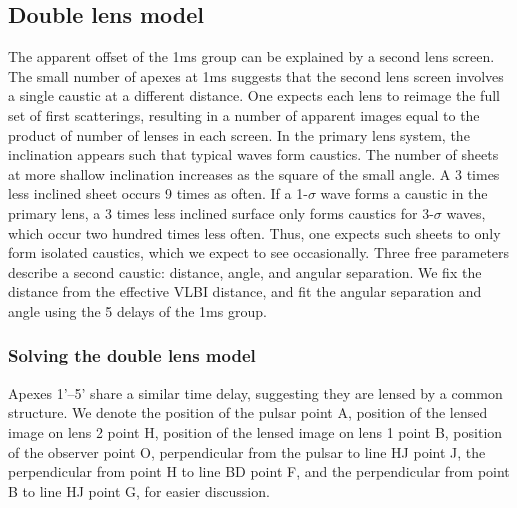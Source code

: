 \documentclass[useAMS,usenatbib]{mn2e}
\begin{document}
\subsection{Double lens model}
\label{doublelensmodel}

The apparent offset of the 1ms group can be explained by a second lens
screen.  The small number of apexes at 1ms suggests that the second
lens screen involves a single caustic at a different distance.  One
expects each lens to reimage the full set of first scatterings,
resulting in a number of apparent images equal to the product of
number of lenses in each screen.
In the
primary lens system, the inclination appears such that typical waves
form caustics.  The number of sheets at more shallow inclination
increases as the square of the small angle.  A 3 times less inclined
sheet occurs 9 times as often.  If a 1-$\sigma$ wave forms a caustic
in the primary lens, a 3 times less inclined surface only forms
caustics for 3-$\sigma$ waves, which occur two hundred times less
often.  Thus, one expects such sheets to only form isolated caustics,
which we expect to see occasionally.  Three free parameters describe a
second caustic: distance, angle, and angular separation.  We fix the
distance from the effective VLBI distance, and fit the angular
separation and angle using the 5 delays of the 1ms group.

\subsubsection{Solving the double lens model}
Apexes 1'--5' share a similar time delay, suggesting they are lensed by
a common structure.
We denote the position of the pulsar point A, position of the lensed image on lens 2 point H, position of the lensed image on lens 1 point B, position of the observer point O, perpendicular from the pulsar to line HJ point J, the perpendicular from point H to line BD point F, and the perpendicular from point B to line HJ point G, for easier discussion.
\end{document}
